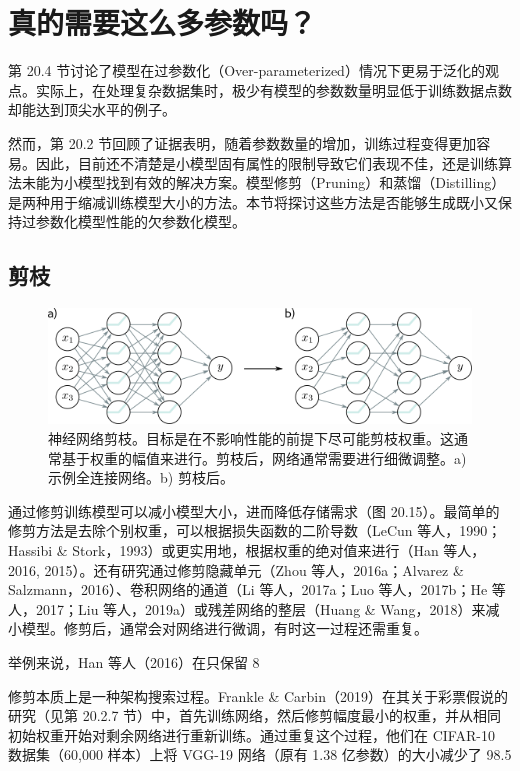 \section{真的需要这么多参数吗？}
第 20.4 节讨论了模型在过参数化（Over-parameterized）情况下更易于泛化的观点。实际上，在处理复杂数据集时，极少有模型的参数数量明显低于训练数据点数却能达到顶尖水平的例子。

然而，第 20.2 节回顾了证据表明，随着参数数量的增加，训练过程变得更加容易。因此，目前还不清楚是小模型固有属性的限制导致它们表现不佳，还是训练算法未能为小模型找到有效的解决方案。模型修剪（Pruning）和蒸馏（Distilling）是两种用于缩减训练模型大小的方法。本节将探讨这些方法是否能够生成既小又保持过参数化模型性能的欠参数化模型。

\subsection{剪枝}
\begin{figure}[ht!]
\centering
\includegraphics[width=0.7\linewidth]{png/chapter20/WhyPruning.png}
\caption{神经网络剪枝。目标是在不影响性能的前提下尽可能剪枝权重。这通常基于权重的幅值来进行。剪枝后，网络通常需要进行细微调整。a) 示例全连接网络。b) 剪枝后。}
\end{figure}
通过修剪训练模型可以减小模型大小，进而降低存储需求（图 20.15）。最简单的修剪方法是去除个别权重，可以根据损失函数的二阶导数（LeCun 等人，1990；Hassibi \& Stork，1993）或更实用地，根据权重的绝对值来进行（Han 等人，2016, 2015）。还有研究通过修剪隐藏单元（Zhou 等人，2016a；Alvarez \& Salzmann，2016）、卷积网络的通道（Li 等人，2017a；Luo 等人，2017b；He 等人，2017；Liu 等人，2019a）或残差网络的整层（Huang \& Wang，2018）来减小模型。修剪后，通常会对网络进行微调，有时这一过程还需重复。

举例来说，Han 等人（2016）在只保留 8%

修剪本质上是一种架构搜索过程。Frankle \& Carbin（2019）在其关于彩票假说的研究（见第 20.2.7 节）中，首先训练网络，然后修剪幅度最小的权重，并从相同初始权重开始对剩余网络进行重新训练。通过重复这个过程，他们在 CIFAR-10 数据集（60,000 样本）上将 VGG-19 网络（原有 1.38 亿参数）的大小减少了 98.5%

